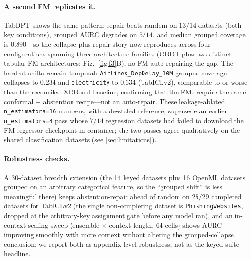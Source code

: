 \documentclass[11pt]{article}
\begin{document}
\paragraph{A second FM replicates it.} TabDPT shows the same pattern: repair beats random on $13/14$ datasets
(both key conditions), grouped AURC degrades on $5/14$, and median grouped coverage is $0.890$---so the
collapse-plus-repair story now reproduces across four configurations spanning three architecture families
(GBDT plus two distinct tabular-FM architectures; Fig.~\ref{fig:f3}B),
no FM auto-repairing the gap. The hardest shifts remain temporal: \texttt{Airlines\_DepDelay\_10M} grouped
coverage collapses to $0.234$ and \texttt{electricity} to $0.634$ (TabICLv2), comparable to or worse than the
reconciled XGBoost baseline, confirming that the FMs require the same conformal + abstention recipe---not an
auto-repair. These leakage-ablated \texttt{n\_estimators=16} numbers, with a de-staled reference, supersede an
earlier \texttt{n\_estimators=4} pass whose $7/14$ regression datasets had failed to download the FM regressor
checkpoint in-container; the two passes agree qualitatively on the shared classification datasets (see
\cref{sec:limitations}). \paragraph{Robustness checks.} A $30$-dataset breadth extension (the 14 keyed datasets
plus 16 OpenML datasets grouped on an arbitrary categorical feature, so the ``grouped shift'' is less
meaningful there) keeps abstention-repair ahead of random on $25/29$ completed datasets for TabICLv2 (the
single non-completing dataset is \texttt{PhishingWebsites}, dropped at the arbitrary-key assignment gate before
any model ran), and an
in-context scaling sweep (ensemble $\times$ context length, 64 cells) shows AURC improving smoothly with more
context without altering the grouped-collapse conclusion; we report both as appendix-level robustness, not as
the keyed-suite headline.
\end{document}
